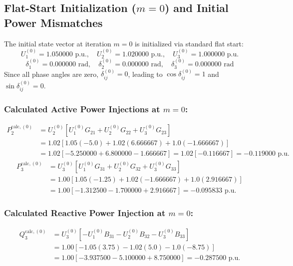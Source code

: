 \documentclass[12pt,a4paper,oneside]{report}
\begin{document}
\subsection{Flat-Start Initialization ($m = 0$) and Initial Power Mismatches}
The initial state vector at iteration $m = 0$ is initialized via standard flat start:
\begin{equation}
U_1^{(0)} = 1.050000\text{ p.u.}, \quad U_2^{(0)} = 1.020000\text{ p.u.}, \quad U_3^{(0)} = 1.000000\text{ p.u.}
\end{equation}
\begin{equation}
\delta_1^{(0)} = 0.000000\text{ rad}, \quad \delta_2^{(0)} = 0.000000\text{ rad}, \quad \delta_3^{(0)} = 0.000000\text{ rad}
\end{equation}
Since all phase angles are zero, $\delta_{ij}^{(0)} = 0$, leading to $\cos\delta_{ij}^{(0)} = 1$ and $\sin\delta_{ij}^{(0)} = 0$.

\subsubsection{Calculated Active Power Injections at $m = 0$:}
\begin{align}
P_2^{\text{calc},(0)} &= U_2^{(0)} \left[ U_1^{(0)} G_{21} + U_2^{(0)} G_{22} + U_3^{(0)} G_{23} \right] \nonumber \\
&= 1.02 \left[ 1.05(-5.0) + 1.02(6.666667) + 1.0(-1.666667) \right] \nonumber \\
&= 1.02 \left[ -5.250000 + 6.800000 - 1.666667 \right] = 1.02 \left[ -0.116667 \right] = -0.119000\text{ p.u.}
\end{align}
\begin{align}
P_3^{\text{calc},(0)} &= U_3^{(0)} \left[ U_1^{(0)} G_{31} + U_2^{(0)} G_{32} + U_3^{(0)} G_{33} \right] \nonumber \\
&= 1.00 \left[ 1.05(-1.25) + 1.02(-1.666667) + 1.0(2.916667) \right] \nonumber \\
&= 1.00 \left[ -1.312500 - 1.700000 + 2.916667 \right] = -0.095833\text{ p.u.}
\end{align}

\subsubsection{Calculated Reactive Power Injection at $m = 0$:}
\begin{align}
Q_3^{\text{calc},(0)} &= U_3^{(0)} \left[ -U_1^{(0)} B_{31} - U_2^{(0)} B_{32} - U_3^{(0)} B_{33} \right] \nonumber \\
&= 1.00 \left[ -1.05(3.75) - 1.02(5.0) - 1.0(-8.75) \right] \nonumber \\
&= 1.00 \left[ -3.937500 - 5.100000 + 8.750000 \right] = -0.287500\text{ p.u.}
\end{align}
\end{document}
